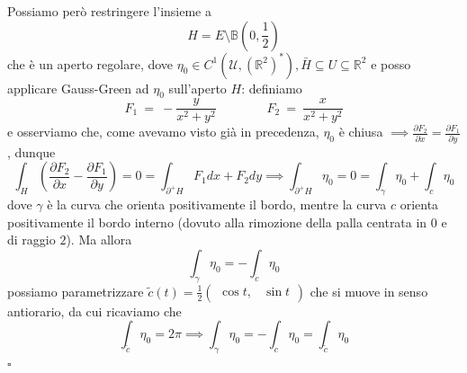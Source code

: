 	Possiamo però restringere l'insieme a
	$$
	H = E \setminus \mathbb{B}(0, \frac{1}{2})
	$$
	che è un aperto regolare, dove $\eta_0 \in C^1(\mathcal{U}, (\mathbb{R}^2)^*), \bar{H} \subseteq U \subseteq \mathbb{R}^2$ e posso applicare Gauss-Green ad $\eta_0$ sull'aperto $H$: definiamo
	\[
		F_1\ =\ -\frac{y}{x^2 + y^2}\qquad\qquad	F_2\ =\ \frac{x}{x^2 + y^2} 
	\]
	e osserviamo che, come avevamo visto già in precedenza, $\eta_0$ è chiusa $\implies \frac{\partial F_2}{\partial x} = \frac{\partial F_1}{\partial y}$, dunque
	$$
	\int_H \left(\frac{\partial F_2}{\partial x} - \frac{\partial F_1}{\partial y} \right) = 0 = \int_{\partial^{+} H} F_1 dx + F_2 dy \implies  \int_{\partial^{+} H} \eta_0 = 0 = \int_\gamma \eta_0 + \int_c \eta_0
	$$
	dove $\gamma$ è la curva che orienta positivamente il bordo, mentre la curva $c$ orienta positivamente il bordo interno (dovuto alla rimozione della palla centrata in $0$ e di raggio $2$). Ma allora
	$$
	\int_\gamma \eta_0 = - \int_c \eta_0
	$$
	possiamo parametrizzare $\tilde{c}(t) = \frac{1}{2} \begin{pmatrix} \cos{t}, & \sin{t} \end{pmatrix}$ che si muove in senso antiorario, da cui ricaviamo che
	$$
	\int_{\tilde{c}} \eta_0 = 2\pi \implies \int_\gamma \eta_0 = - \int_c \eta_0 = \int_{\tilde{c}} \eta_0
	$$
\hfill $\square$
%
\vspace{0.5cm}
